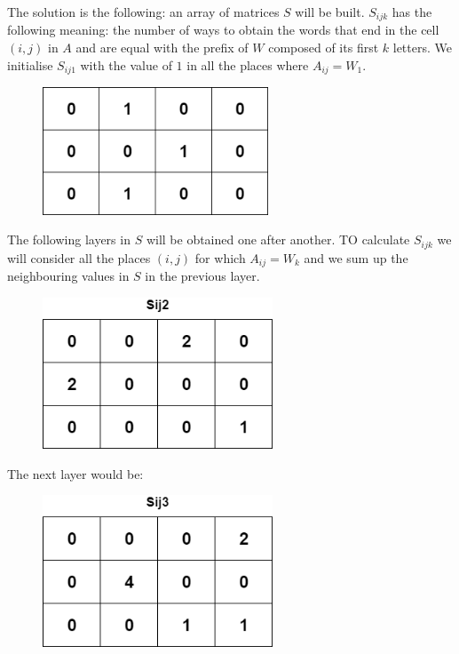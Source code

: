 \documentclass[letterpaper]{article}
\begin{document}
The solution is the following: an array of matrices $S$ will be built. $S_{ijk}$ has the following meaning: the number of ways to obtain the words that end in the cell $(i,j)$ in $A$ and are equal with the prefix of $W$ composed of its first $k$ letters. We initialise $S_{ij1}$ with the value of $1$ in all the places where $A_{ij} = W_1$.

\newpage

\begin{figure} [h!]
\centering
\includegraphics[width=0.60\textwidth]{pngOfDiagrams/dppaths3.png}
\end{figure}

The following layers in $S$ will be obtained one after another. TO calculate $S_{ijk}$ we will consider all the places $(i,j)$ for which $A_{ij} = W_k$ and we sum up the neighbouring values in $S$ in the previous layer.

\begin{figure} [h!]
\centering
\includegraphics[width=0.612\textwidth]{pngOfDiagrams/dppaths4.png}
\end{figure}

The next layer would be:

\begin{figure} [h!]
\centering
\includegraphics[width=0.612\textwidth]{pngOfDiagrams/dppaths5.png}
\end{figure}
\end{document}
